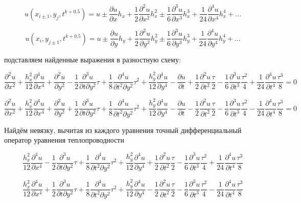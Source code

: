 \documentclass[a4paper,14pt]{article}
\begin{document}
$$u(x_{i \pm 1} , y_j, t^{k+0.5}) = u \pm \frac{\partial u}{\partial x} h_x + \frac{1}{2} \frac{\partial^2 u}{\partial x^2}h_x^2 \pm
\frac{1}{6} \frac{\partial^3 u}{\partial x^3}h_x^3 +
\frac{1}{24} \frac{\partial^4 u}{\partial x^4}h_x^4 + ...$$

$$u(x_i, y_{j \pm 1}, t^{k+0.5}) = u \pm \frac{\partial u}{\partial y} h_y + \frac{1}{2} \frac{\partial^2 u}{\partial y^2}h_y^2 \pm
\frac{1}{6} \frac{\partial^3 u}{\partial y^3}h_y^3 +
\frac{1}{24} \frac{\partial^4 u}{\partial y^4}h_y^4 + ...$$

\noindent подставляем найденные выражения в разностную схему:

$$\frac{\partial^2 u}{\partial x^2} + \frac{h_x^2}{12} \frac{\partial^4 u}{\partial x^4} + \frac{\partial^2 u}{\partial y^2}- \frac{1}{2} \frac{\partial^3 u}{\partial t \partial y^2} \tau + \frac{1}{8}\frac{\partial^4 u}{\partial t^2 \partial y^2} \tau^2 + \frac{h_y^2}{12} \frac{\partial^4 u}{\partial y^4} - \frac{\partial u}{\partial t}+ \frac{1}{2}\frac{\partial^2 u}{\partial t^2}\frac{\tau}{2}- \frac{1}{6}\frac{\partial^3 u}{\partial t^3}\frac{\tau^2}{4}+\frac{1}{24}\frac{\partial^4 u}{\partial t^4}\frac{\tau^3}{8}=0$$

$$\frac{\partial^2 u}{\partial x^2} + \frac{h_x^2}{12} \frac{\partial^4 u}{\partial x^4} + \frac{\partial^2 u}{\partial y^2}+ \frac{1}{2} \frac{\partial^3 u}{\partial t \partial y^2} \tau + \frac{1}{8}\frac{\partial^4 u}{\partial t^2 \partial y^2} \tau^2 + \frac{h_y^2}{12} \frac{\partial^4 u}{\partial y^4} - \frac{\partial u}{\partial t} - \frac{1}{2}\frac{\partial^2 u}{\partial t^2}\frac{\tau}{2}- \frac{1}{6}\frac{\partial^3 u}{\partial t^3}\frac{\tau^2}{4}-\frac{1}{24}\frac{\partial^4 u}{\partial t^4}\frac{\tau^3}{8}=0$$

\noindent Найдём невязку, вычитая из каждого уравнения точный дифференциальный оператор уравнения теплопроводности

$$\frac{h_x^2}{12} \frac{\partial^4 u}{\partial x^4} - \frac{1}{2} \frac{\partial^3 u}{\partial t \partial y^2} \tau + \frac{1}{8}\frac{\partial^4 u}{\partial t^2 \partial y^2} \tau^2 + \frac{h_y^2}{12} \frac{\partial^4 u}{\partial y^4} + \frac{1}{2}\frac{\partial^2 u}{\partial t^2}\frac{\tau}{2}- \frac{1}{6}\frac{\partial^3 u}{\partial t^3}\frac{\tau^2}{4}+\frac{1}{24}\frac{\partial^4 u}{\partial t^4}\frac{\tau^3}{8}$$

$$\frac{h_x^2}{12} \frac{\partial^4 u}{\partial x^4} + \frac{1}{2} \frac{\partial^3 u}{\partial t \partial y^2} \tau + \frac{1}{8}\frac{\partial^4 u}{\partial t^2 \partial y^2} \tau^2 + \frac{h_y^2}{12} \frac{\partial^4 u}{\partial y^4} - \frac{1}{2}\frac{\partial^2 u}{\partial t^2}\frac{\tau}{2}- \frac{1}{6}\frac{\partial^3 u}{\partial t^3}\frac{\tau^2}{4}-\frac{1}{24}\frac{\partial^4 u}{\partial t^4}\frac{\tau^3}{8}$$
\end{document}
